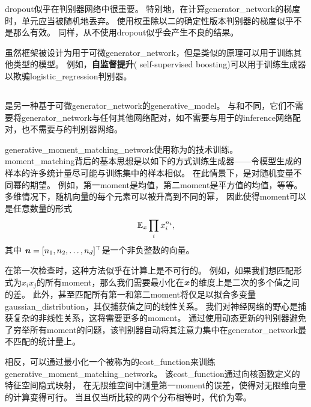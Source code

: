 
\gls{dropout}似乎在判别器网络中很重要。
特别地，在计算\gls{generator_network}的梯度时，单元应当被随机地丢弃。
使用权重除以二的确定性版本判别器的梯度似乎不是那么有效。
同样，从不使用\gls{dropout}似乎会产生不良的结果。


虽然框架被设计为用于可微\gls{generator_network}，但是类似的原理可以用于训练其他类型的模型。
例如，\textbf{自监督提升}( self-supervised boosting)可以用于训练生成器以欺骗\gls{logistic_regression}判别器\citep{welling2002self}。


\subsection{}
\label{sec:generative_moment_matching_networks}

\citep{Li-et-al-2015,dziugaite2015training}是另一种基于可微\gls{generator_network}的\gls{generative_model}。
与和不同，它们不需要将\gls{generator_network}与任何其他网络配对，如不需要与用于的\gls{inference}网络配对，也不需要与的判别器网络。


\gls{generative_moment_matching_network}使用称为的技术训练。
\gls{moment_matching}背后的基本思想是以如下的方式训练生成器——令模型生成的样本的许多统计量尽可能与训练集中的样本相似。
在此情景下，是对随机变量不同幂的期望。
例如，第一\gls{moment}是均值，第二\gls{moment}是平方值的均值，等等。
多维情况下，随机向量的每个元素可以被升高到不同的幂， 因此使得\gls{moment}可以是任意数量的形式 %
\begin{align}
 \mathbb{E}_{\boldsymbol{\mathit{x}}} \prod_i x_i^{n_i},
\end{align}
其中 $\boldsymbol{\mathit{n}} = [n_1, n_2, \dots, n_d]^\top$是一个非负整数的向量。


在第一次检查时，这种方法似乎在计算上是不可行的。
例如，如果我们想匹配形式为$x_ix_j$的所有\gls{moment}，那么我们需要最小化在$\boldsymbol{\mathit{x}}$的维度上是二次的多个值之间的差。
此外，甚至匹配所有第一和第二\gls{moment}将仅足以拟合多变量\gls{gaussian_distribution}，其仅捕获值之间的线性关系。
我们对神经网络的野心是捕获复杂的非线性关系，这将需要更多的\gls{moment}。
通过使用动态更新的判别器避免了穷举所有\gls{moment}的问题，该判别器自动将其注意力集中在\gls{generator_network}最不匹配的统计量上。


相反，可以通过最小化一个被称为\citep{scholkopf2002learning,gretton2012kernel}的\gls{cost_function}来训练\gls{generative_moment_matching_network}。
该\gls{cost_function}通过向核函数定义的特征空间隐式映射， 在无限维空间中测量第一\gls{moment}的误差，使得对无限维向量的计算变得可行。
当且仅当所比较的两个分布相等时，代价为零。

